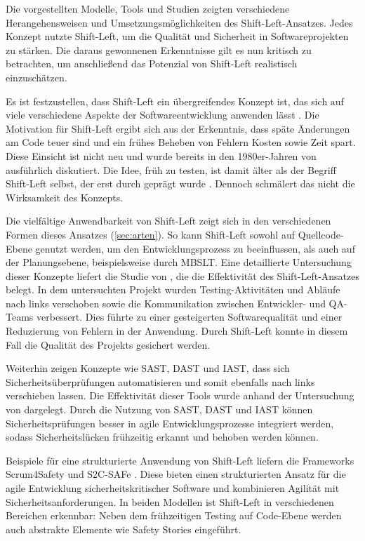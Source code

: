 Die vorgestellten Modelle, Tools und Studien zeigten verschiedene Herangehensweisen und Umsetzungsmöglichkeiten des Shift-Left-Ansatzes. Jedes Konzept nutzte Shift-Left, um die Qualität und Sicherheit in Softwareprojekten zu stärken. Die daraus gewonnenen Erkenntnisse gilt es nun kritisch zu betrachten, um anschließend das Potenzial von Shift-Left realistisch einzuschätzen.

Es ist festzustellen, dass Shift-Left ein übergreifendes Konzept ist, das sich auf viele verschiedene Aspekte der Softwareentwicklung anwenden lässt \cite{andriadi_impact_2023}. Die Motivation für Shift-Left ergibt sich aus der Erkenntnis, dass späte Änderungen am Code teuer sind und ein frühes Beheben von Fehlern Kosten sowie Zeit spart. Diese Einsicht ist nicht neu und wurde bereits in den 1980er-Jahren von \citet{boehm_software_1984} ausführlich diskutiert. Die Idee, früh zu testen, ist damit älter als der Begriff Shift-Left selbst, der erst durch \cite{smith_shift-left_2001} geprägt wurde \cite{dawoud_better_2024}. Dennoch schmälert das nicht die Wirksamkeit des Konzepts.

Die vielfältige Anwendbarkeit von Shift-Left zeigt sich in den verschiedenen Formen dieses Ansatzes (\ref{sec:arten}). So kann Shift-Left sowohl auf Quellcode-Ebene genutzt werden, um den Entwicklungsprozess zu beeinflussen, als auch auf der Planungsebene, beispielsweise durch MBSLT. Eine detaillierte Untersuchung dieser Konzepte liefert die Studie von \cite{andriadi_impact_2023}, die die Effektivität des Shift-Left-Ansatzes belegt. In dem untersuchten Projekt wurden Testing-Aktivitäten und Abläufe nach links verschoben sowie die Kommunikation zwischen Entwickler- und QA-Teams verbessert. Dies führte zu einer gesteigerten Softwarequalität und einer Reduzierung von Fehlern in der Anwendung. Durch Shift-Left konnte in diesem Fall die Qualität des Projekts gesichert werden.

Weiterhin zeigen Konzepte wie SAST, DAST und IAST, dass sich Sicherheitsüberprüfungen automatisieren und somit ebenfalls nach links verschieben lassen. Die Effektivität dieser Tools wurde anhand der Untersuchung von \citet{mateo_tudela_combining_2020} dargelegt. Durch die Nutzung von SAST, DAST und IAST können Sicherheitsprüfungen besser in agile Entwicklungsprozesse integriert werden, sodass Sicherheitslücken frühzeitig erkannt und behoben werden können.

Beispiele für eine strukturierte Anwendung von Shift-Left liefern die Frameworks Scrum4Safety und S2C-SAFe \cite{barbareschi_scrum_2022} \cite{moyon_how_2020}. Diese bieten einen strukturierten Ansatz für die agile Entwicklung sicherheitskritischer Software und kombinieren Agilität mit Sicherheitsanforderungen. In beiden Modellen ist Shift-Left in verschiedenen Bereichen erkennbar: Neben dem frühzeitigen Testing auf Code-Ebene werden auch abstrakte Elemente wie Safety Stories eingeführt.

